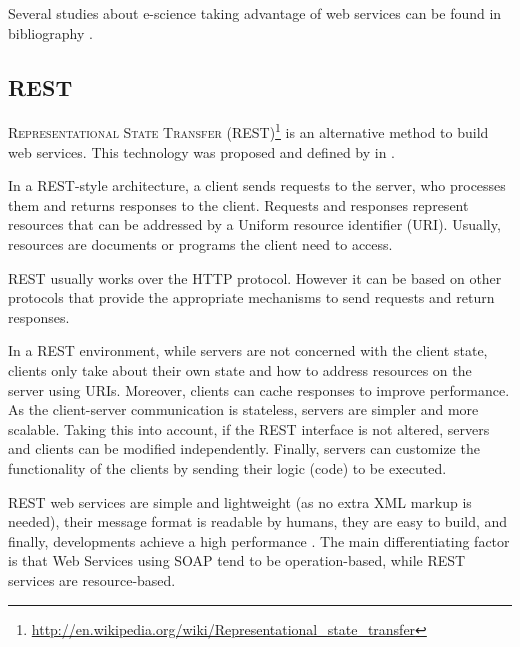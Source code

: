 Several studies about e-science taking advantage of web services can be found in bibliography \cite{Oinn04Taverna,davidson08workflows,Ludascher06Kepler,Perera06workflows}.

\subsection{REST}
\textsc{Representational State Transfer} (REST)\footnote{\url{http://en.wikipedia.org/wiki/Representational_state_transfer}} is an alternative method to build web services.
This technology %
was proposed and defined by  in \cite{Fielding2002}.

In a REST-style architecture, a client sends requests to the server, who processes them and returns responses to the client.
Requests and responses represent resources that can be addressed by a Uniform resource identifier (URI). Usually, resources are documents or programs the client need to access.

REST usually works over the HTTP protocol. However it can be based on other protocols that provide the appropriate mechanisms to send requests and return responses.

In a REST environment, while servers are not concerned with the client state, clients only take about their own state and how to address resources on the server using URIs. Moreover, clients can cache responses to improve performance.
As the client-server communication is stateless, servers are simpler and more scalable. 
Taking this into account, if the REST interface is not altered, servers and clients can be modified independently.
Finally, servers can customize the functionality of the clients by sending their logic (code) to be executed.


REST web services are simple and lightweight (as no extra XML markup
is needed), their message format is readable by humans, they are easy
to build, and finally, developments achieve a high performance
\cite{Daigneau2011}. %
The main differentiating factor is that Web Services using SOAP tend to be operation-based, while REST services are resource-based.

